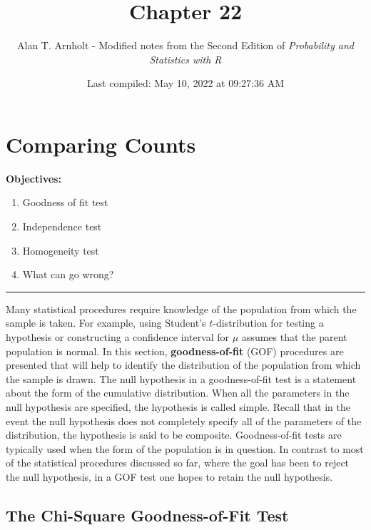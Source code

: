 \documentclass[
]{article}
\title{Chapter 22}
\author{Alan T. Arnholt - Modified notes from the Second Edition of \emph{Probability and Statistics with R}}
\date{Last compiled: May 10, 2022 at 09:27:36 AM}
\begin{document}
\maketitle

{
\setcounter{tocdepth}{2}
\tableofcontents
}
\hypertarget{comparing-counts}{%
\section{Comparing Counts}\label{comparing-counts}}

\textbf{Objectives:}

\begin{enumerate}
\def\labelenumi{\Roman{enumi}.}
\item
  Goodness of fit test
\item
  Independence test
\item
  Homogeneity test
\item
  What can go wrong?
\end{enumerate}

\begin{center}\rule{0.5\linewidth}{0.5pt}\end{center}

Many statistical procedures require knowledge of the population from which the sample is taken. For example, using Student's \(t\)-distribution for testing a hypothesis or constructing a confidence interval for \(\mu\) assumes that the parent population is normal. In this section, \textbf{goodness-of-fit} (GOF) procedures are presented that will help to identify the distribution of the population from which the sample is drawn. The null hypothesis in a goodness-of-fit test is a statement about the form of the cumulative distribution. When all the parameters in the null hypothesis are specified, the hypothesis is called simple. Recall that in the event the null hypothesis does not completely specify all of the parameters of the distribution, the hypothesis is said to be composite. Goodness-of-fit tests are typically used when the form of the population is in question. In contrast to most of the statistical procedures discussed so far, where the goal has been to reject the null hypothesis, in a GOF test one hopes to retain the null hypothesis.

\hypertarget{the-chi-square-goodness-of-fit-test}{%
\subsection{The Chi-Square Goodness-of-Fit Test}\label{the-chi-square-goodness-of-fit-test}}
\end{document}
